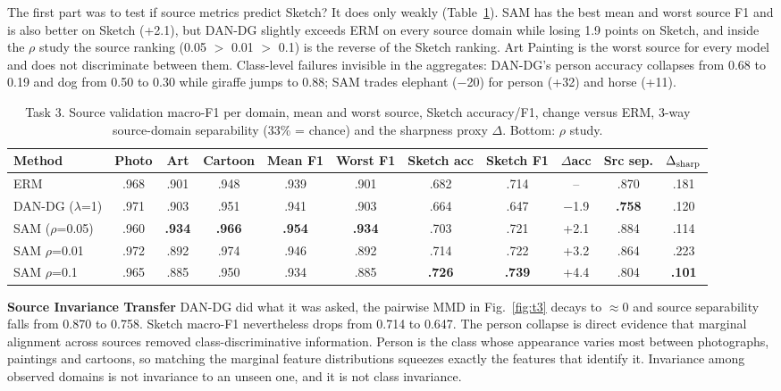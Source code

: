 \documentclass{article}
\begin{document}
The first part was to test if source metrics predict Sketch? It does only weakly (Table~\ref{tab:t3}). SAM has the best mean and worst source F1 and is also better on Sketch (+2.1), but DAN-DG slightly exceeds ERM on every source domain while losing 1.9 points on Sketch, and inside the $\rho$ study the source ranking (0.05 $>$ 0.01 $>$ 0.1) is the reverse of the Sketch ranking. Art Painting is the worst source for every model and does not discriminate between them. Class-level failures invisible in the aggregates: DAN-DG's person accuracy collapses from 0.68 to 0.19 and dog from 0.50 to 0.30 while giraffe jumps to 0.88; SAM trades elephant ($-$20) for person (+32) and horse (+11).


\begin{table}[!htbp]
\centering\small
\caption{Task 3. Source validation macro-F1 per domain, mean and worst source, Sketch accuracy/F1, change versus ERM,
3-way source-domain separability (33\% = chance) and the sharpness proxy $\Delta$. Bottom: $\rho$ study.}
\label{tab:t3}
\setlength{\tabcolsep}{3.5pt}
\begin{tabular}{@{}lcccccccccc@{}}
\toprule
Method & Photo & Art & Cartoon & Mean F1 & Worst F1 & Sketch acc & Sketch F1 & $\Delta$acc & Src sep. & $\Delta_{\rm sharp}$ \\
\midrule
ERM & .968 & .901 & .948 & .939 & .901 & .682 & .714 & -- & .870 & .181 \\
DAN-DG ($\lambda$=1) & .971 & .903 & .951 & .941 & .903 & .664 & .647 & $-$1.9 & \textbf{.758} & .120 \\
SAM ($\rho$=0.05) & .960 & \textbf{.934} & \textbf{.966} & \textbf{.954} & \textbf{.934} & .703 & .721 & +2.1 & .884 & .114 \\
\midrule
SAM $\rho$=0.01 & .972 & .892 & .974 & .946 & .892 & .714 & .722 & +3.2 & .864 & .223 \\
SAM $\rho$=0.1 & .965 & .885 & .950 & .934 & .885 & \textbf{.726} & \textbf{.739} & +4.4 & .804 & \textbf{.101} \\
\bottomrule
\end{tabular}
\end{table}


\textbf{Source Invariance Transfer} DAN-DG did what it was asked, the pairwise MMD in Fig.~\ref{fig:t3} decays to $\approx0$ and source separability falls from 0.870 to 0.758. Sketch macro-F1 nevertheless drops from 0.714 to 0.647. The person collapse is direct evidence that marginal alignment across sources removed class-discriminative information. Person is the class whose appearance varies most between photographs, paintings and cartoons, so matching the marginal feature distributions squeezes exactly the features that identify it. Invariance among observed domains is not invariance to an unseen one, and it is not class invariance.
\end{document}
